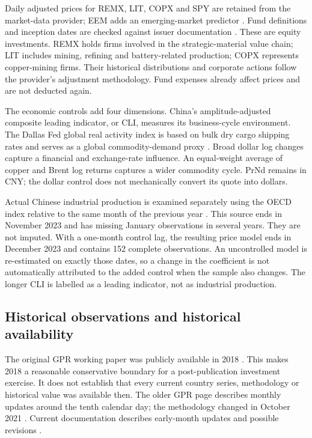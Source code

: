 Daily adjusted prices for REMX, LIT, COPX and SPY are retained from the market-data provider; EEM adds an emerging-market predictor \citep{yahoo2026}. Fund definitions and inception dates are checked against issuer documentation \citep{vaneck2026,globalxlit,globalxcopx}. These are equity investments. REMX holds firms involved in the strategic-material value chain; LIT includes mining, refining and battery-related production; COPX represents copper-mining firms. Their historical distributions and corporate actions follow the provider's adjustment methodology. Fund expenses already affect prices and are not deducted again.

The economic controls add four dimensions. China's amplitude-adjusted composite leading indicator, or CLI, measures its business-cycle environment. The Dallas Fed global real activity index is based on bulk dry cargo shipping rates and serves as a global commodity-demand proxy \citep{dallas2026}. Broad dollar log changes capture a financial and exchange-rate influence. An equal-weight average of copper and Brent log returns captures a wider commodity cycle. PrNd remains in CNY; the dollar control does not mechanically convert its quote into dollars.

Actual Chinese industrial production is examined separately using the OECD index relative to the same month of the previous year \citep{oecd2026}. This source ends in November 2023 and has missing January observations in several years. They are not imputed. With a one-month control lag, the resulting price model ends in December 2023 and contains 152 complete observations. An uncontrolled model is re-estimated on exactly those dates, so a change in the coefficient is not automatically attributed to the added control when the sample also changes. The longer CLI is labelled as a leading indicator, not as industrial production.

\subsection{Historical observations and historical availability}

The original GPR working paper was publicly available in 2018 \citep{caldara2018}. This makes 2018 a reasonable conservative boundary for a post-publication investment exercise. It does not establish that every current country series, methodology or historical value was available then. The older GPR page describes monthly updates around the tenth calendar day; the methodology changed in October 2021 \citep{gprold2021}. Current documentation describes early-month updates and possible revisions \citep{gprdata}.


